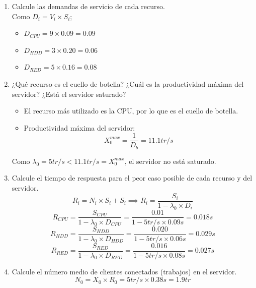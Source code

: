 \documentclass[12pt,spanish]{article}
\begin{document}
\begin{enumerate}
	\item Calcule las demandas de servicio de cada recurso.\\
		Como $D_i=V_i \times S_i$;
		\begin{itemize}
			\item $D_{CPU} = 9 \times 0.09 = 0.09$
			\item $D_{HDD} = 3 \times 0.20 = 0.06$
			\item $D_{RED} = 5 \times 0.16 = 0.08$
		\end{itemize}
	\item ¿Qué recurso es el cuello de botella? ¿Cuál es la productividad máxima del servidor? ¿Está el servidor saturado?
		\begin{itemize}
			\item El recurso más utilizado es la CPU, por lo que es el cuello de botella.
			\item Productividad máxima del servidor:
				\begin{equation*}
					X_0^{max}=\frac{1}{D_b}=11.1 tr/s
				\end{equation*}
		\end{itemize}
		Como $\lambda_0 = 5 tr/s < 11.1 tr/s = X_0^{max}$, el servidor no está saturado.
	\item Calcule el tiempo de respuesta para el peor caso posible de cada recurso y del servidor.
		\begin{equation*}
			R_i=N_i \times S_i + S_i \implies R_i = \frac{S_i}{1 - \lambda_0 \times D_i}
		\end{equation*}
		\begin{equation*}
			R_{CPU} = \frac{S_{CPU}}{1 - \lambda_0 \times D_{CPU}} = \frac{0.01}{1 - 5 tr/s \times 0.09 s} = 0.018 s
		\end{equation*}
		\begin{equation*}
			R_{HDD} = \frac{S_{HDD}}{1 - \lambda_0 \times D_{HDD}} = \frac{0.020}{1 - 5 tr/s \times 0.06 s} =  0.029 s
		\end{equation*}
		\begin{equation*}
			R_{RED} = \frac{S_{RED}}{1 - \lambda_0 \times D_{RED}} = \frac{0.016}{1 - 5 tr/s \times 0.08 s} = 0.027 s
		\end{equation*}
	\item Calcule el número medio de clientes conectados (trabajos) en el servidor.
		\begin{equation*}
			N_0 = X_0 \times R_0 = 5 tr/s \times 0.38 s = 1.9 tr
		\end{equation*}

\end{enumerate}
\end{document}
